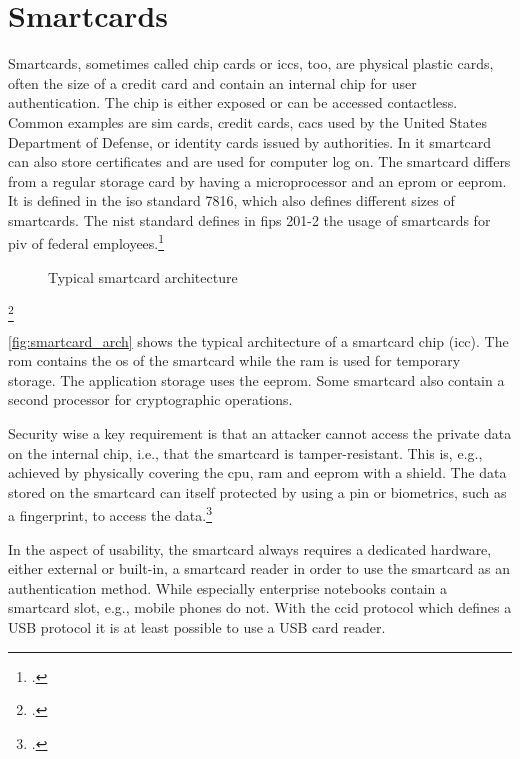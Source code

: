 \section{Smartcards}

Smartcards, sometimes called chip cards or \glspl{icc}, too, are physical plastic cards, often the size of a credit card and contain an internal chip for user authentication. The chip is either exposed or can be accessed contactless. Common examples are \gls{sim} cards, credit cards, \glspl{cac} used by the United States Department of Defense, or identity cards issued by authorities. In \gls{it} smartcard can also store certificates and are used for computer log on. The smartcard differs from a regular storage card by having a microprocessor and an \gls{eprom} or \gls{eeprom}. It is defined in the \gls{iso} standard 7816, which also defines different sizes of smartcards. The \gls{nist} standard defines in \gls{fips} 201-2 the usage of smartcards for \gls{piv} of federal employees.\footcites[See][525--527]{eckert-it-sec-9}[See][]{iso7816}[See][6--9]{1698485}[See][]{FIPS201-2}


\begin{figure}[hbt]
	\centering
	
	\caption[Typical smartcard architecture]{Typical smartcard architecture\footnotemark}
	\label{fig:smartcard_arch}
\end{figure}
\footcitetexts[Source: diagram by author, based on][33]{electronic_certification_mobile_devices}[][228]{1698485}

\autoref{fig:smartcard_arch} shows the typical architecture of a smartcard chip (\gls{icc}). The \gls{rom} contains the \gls{os} of the smartcard while the \gls{ram} is used for temporary storage. The application storage uses the \gls{eeprom}. Some smartcard also contain a second processor for cryptographic operations.

Security wise a key requirement is that an attacker cannot access the private data on the internal chip, i.e., that the smartcard is tamper-resistant. This is, e.g., achieved by physically covering the \gls{cpu}, \gls{ram} and \gls{eeprom} with a shield. The data stored on the smartcard can itself protected by using a \gls{pin} or biometrics, such as a fingerprint, to access the data.\footcites[See][34]{265831}[See][228]{1698485}

In the aspect of usability, the smartcard always requires a dedicated hardware, either external or built-in, a smartcard reader in order to use the smartcard as an authentication method. While especially enterprise notebooks contain a smartcard slot, e.g., mobile phones do not. With the \gls{ccid} protocol which defines a USB protocol it is at least possible to use a USB card reader.
